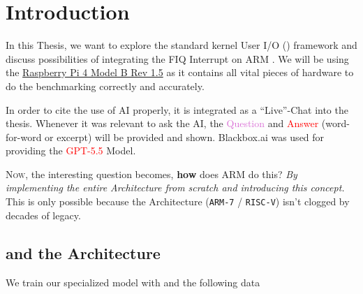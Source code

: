 \documentclass[../main.tex]{subfiles}
\begin{document}
    \clearpage
    \section{Introduction}

    In this Thesis, we want to explore the standard kernel User I/O (\UIO) framework and discuss possibilities of integrating the FIQ Interrupt on ARM \blindCite. We will be using the \href{https://www.raspberrypi.com/products/raspberry-pi-4-model-b/specifications/}{Raspberry Pi 4 Model B Rev 1.5} as it contains all vital pieces of hardware to do the benchmarking correctly and accurately.

    In order to cite the use of AI properly, it is integrated as a \enquote{Live}-Chat into the thesis. Whenever it was relevant to ask the AI, the \textcolor{Orchid}{Question} and \textcolor{red}{Answer} (word-for-word or excerpt) will be provided and shown. Blackbox.ai was used for providing the \textcolor{red}{GPT-5.5} Model.


    \textsc{Now}, the interesting question becomes, \textbf{how} does ARM do this?\lf
    \textit{By implementing the entire Architecture from scratch and introducing this concept.}\lf
    This is only possible because the Architecture (\texttt{ARM-7} / \texttt{RISC-V}) isn't clogged by decades of legacy.


    \bigskip


    \subsection{ and the \ARM{} Architecture}

    We train our specialized \AI{} model with  and the following data
\end{document}
